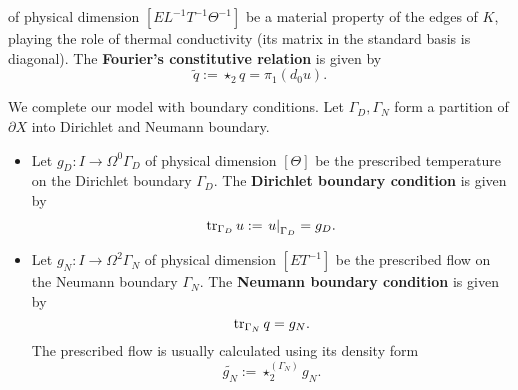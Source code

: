 \begin{discussion}
\begin{itemize}
      of physical dimension $[E L^{-1} T^{-1} \Theta^{-1}]$
      be a material property of the edges of $K$,
      playing the role of thermal conductivity
      (its matrix in the standard basis is diagonal).
      The \textbf{Fourier's constitutive relation} is given by
      \begin{equation}
        \tilde{q} := \star_2 q = \pi_1 (d_0 u).
      \end{equation}
  \end{itemize}
  We complete our model with boundary conditions.
  Let $\Gamma_D, \Gamma_N$ form a partition of $\partial X$
  into Dirichlet and Neumann boundary.
  \begin{itemize}
    \item
      Let $g_D \colon I \to \Omega^0 \Gamma_D$
      of physical dimension $[\Theta]$
      be the prescribed temperature on the Dirichlet boundary $\Gamma_D$.
      The \textbf{Dirichlet boundary condition} is given by
      \begin{equation}
        \mathop{\rm tr}\nolimits_{\Gamma_D} u := \left. u \right|_{\Gamma_D} = g_D.
      \end{equation}
    \item
      Let
        $g_N \colon I \to \Omega^2 \Gamma_N$
          of physical dimension $[E T^{-1}]$
          be the prescribed flow on the Neumann boundary $\Gamma_N$.
      The \textbf{Neumann boundary condition} is given by
      \begin{equation}
        \mathop{\rm tr}\nolimits_{\Gamma_N} q = g_N.
      \end{equation}
      The prescribed flow is usually calculated using its density form
      \begin{equation}
        \widetilde{g_N} := \star^{(\Gamma_N)}_2 g_N.
      \end{equation}
  \end{itemize}
\end{discussion}
